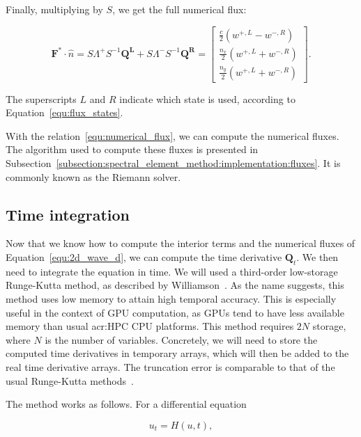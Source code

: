 \noindent
Finally, multiplying by $S$, we get the full numerical flux:

\begin{equation} \label{equ:numerical_flux}
    \mathbf{F}^* \cdot \widehat{n} = 
    S \Lambda^+ S^{-1} \mathbf{\mathbf{Q}^L} + S \Lambda^- S^{-1} \mathbf{\mathbf{Q}^R} =
    \begin{bmatrix}
        \frac{c}{2} \left( w^{+, L} - w^{-, R} \right) \\
        \frac{n_x}{2} \left( w^{+, L} + w^{-, R} \right) \\
        \frac{n_y}{2} \left( w^{+, L} + w^{-, R} \right)
    \end{bmatrix}.
\end{equation}

The superscripts $L$ and $R$ indicate which state is used, according to
Equation~\ref{equ:flux_states}. 

With the relation~\ref{equ:numerical_flux}, we can compute the numerical fluxes. The algorithm used
to compute these fluxes is presented in
Subsection~\ref{subsection:spectral_element_method:implementation:fluxes}. It is commonly known as
the Riemann solver.

\subsection{Time integration} \label{subsection:spectral_element_method:dg_sem:time}

Now that we know how to compute the interior terms and the numerical fluxes of
Equation~\ref{equ:2d_wave_d}, we can compute the time derivative $\mathbf{Q}_t$. We then need to
integrate the equation in time. We will used a third-order low-storage Runge-Kutta method, as
described by Williamson~\cite{Williamson1980}. As the name suggests, this method uses low memory to
attain high temporal accuracy. This is especially useful in the context of GPU computation, as GPUs
tend to have less available memory than usual \acrshort{acr:HPC} CPU platforms. This method requires
$2 N$ storage, where $N$ is the number of variables. Concretely, we will need to store the computed
time derivatives in temporary arrays, which will then be added to the real time derivative arrays.
The truncation error is comparable to that of the usual Runge-Kutta methods~\cite{Williamson1980}.

The method works as follows. For a differential equation

\begin{equation}
	u_t = H(u, t),
\end{equation}

